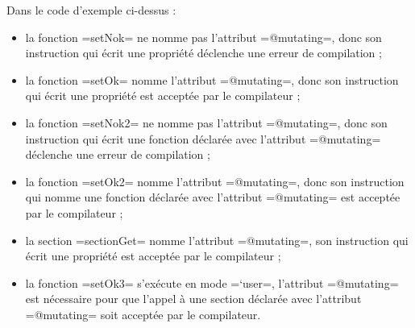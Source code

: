 
Dans le code d'exemple ci-dessus :
\begin{itemize}
  \item la fonction \plm=setNok= ne nomme pas l'attribut \plm=@mutating=, donc son instruction qui écrit une propriété déclenche une erreur de compilation ;
  \item la fonction \plm=setOk= nomme l'attribut \plm=@mutating=, donc son instruction qui écrit une propriété est acceptée par le compilateur ;
  \item la fonction \plm=setNok2= ne nomme pas l'attribut \plm=@mutating=, donc son instruction qui écrit une fonction déclarée avec l'attribut \plm=@mutating= déclenche une erreur de compilation ;
  \item la fonction \plm=setOk2= nomme l'attribut \plm=@mutating=, donc son instruction qui nomme une fonction déclarée avec l'attribut \plm=@mutating= est acceptée par le compilateur ;
  \item la section \plm=sectionGet= nomme l'attribut \plm=@mutating=, son instruction qui écrit une propriété est acceptée par le compilateur ;
  \item la fonction \plm=setOk3= s'exécute en mode \plm=`user=, l'attribut \plm=@mutating= est nécessaire pour que l'appel à une section déclarée avec l'attribut \plm=@mutating= soit acceptée par le compilateur.
\end{itemize}












